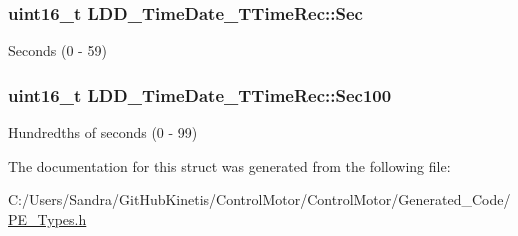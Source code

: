 \subsubsection[{\texorpdfstring{Sec}{Sec}}]{\setlength{\rightskip}{0pt plus 5cm}uint16\+\_\+t L\+D\+D\+\_\+\+Time\+Date\+\_\+\+T\+Time\+Rec\+::\+Sec}\hypertarget{struct_l_d_d___time_date___t_time_rec_a05cccc86e89e5704b0460caaf2429f75}{}\label{struct_l_d_d___time_date___t_time_rec_a05cccc86e89e5704b0460caaf2429f75}
Seconds (0 -\/ 59) 
\subsubsection[{\texorpdfstring{Sec100}{Sec100}}]{\setlength{\rightskip}{0pt plus 5cm}uint16\+\_\+t L\+D\+D\+\_\+\+Time\+Date\+\_\+\+T\+Time\+Rec\+::\+Sec100}\hypertarget{struct_l_d_d___time_date___t_time_rec_a2cd2e13e7c478f04ea1c4c460b104491}{}\label{struct_l_d_d___time_date___t_time_rec_a2cd2e13e7c478f04ea1c4c460b104491}
Hundredths of seconds (0 -\/ 99) 

The documentation for this struct was generated from the following file\+:\begin{DoxyCompactItemize}
\item 
C\+:/\+Users/\+Sandra/\+Git\+Hub\+Kinetis/\+Control\+Motor/\+Control\+Motor/\+Generated\+\_\+\+Code/\hyperlink{_p_e___types_8h}{P\+E\+\_\+\+Types.\+h}\end{DoxyCompactItemize}
